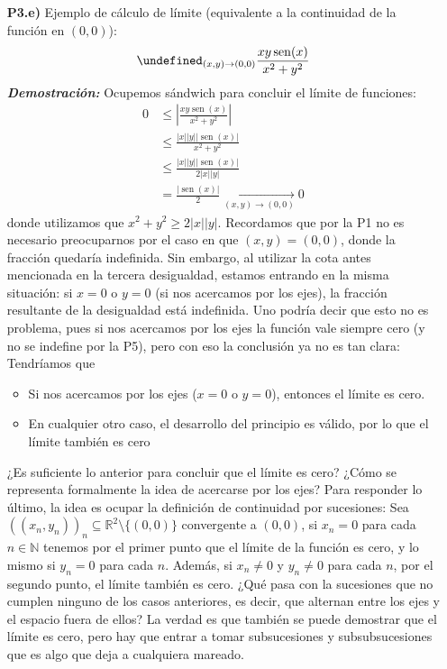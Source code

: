 \documentclass[letterpaper,11pt]{article}
\DeclareMathOperator{\sen}{sen}
\let\lim=\undefined\DeclareMathOperator*{\lim}{\text{lím}}
\newcommand{\conv}[2]{\xrightarrow[#1\to#2]{}}
\newcommand{\N}{\mathbb{N}}
\newcommand{\R}{\mathbb{R}}
\newcommand{\dem}{\textbf{\emph{Demostraci\'on: }}}
\newcommand{\vabs}[1]{\lvert #1\rvert}
\begin{document}

\begin{enumerate}\setlength{\itemsep}{0.4cm}	
\item[]
\end{enumerate}
\begin{enumerate}

\item[\textbf{P3.e)}] Ejemplo de cálculo de límite (equivalente a la continuidad de la función en $(0,0)$):
\[\lim_{(x,y)\to(0,0)} \frac{xy\sen(x)}{x^2+y^2}\]
\dem Ocupemos sándwich para concluir el límite de funciones:
\begin{align*}
    0&\leq\left\lvert\frac{xy\sen(x)}{x^2+y^2}\right\rvert\\
    &\leq\frac{\vabs{x}\vabs{y}\vabs{\sen(x)}}{x^2+y^2}\\
    &\leq\frac{\vabs{x}\vabs{y}\vabs{\sen(x)}}{2\vabs{x}\vabs{y}}\\
    &=\frac{\vabs{\sen(x)}}{2}\conv{(x,y)}{(0,0)}0
\end{align*}
donde utilizamos que $x^2+y^2\geq2\vabs{x}\vabs{y}$. Recordamos que por la P1 no es necesario preocuparnos por el caso en que $(x,y)=(0,0)$, donde la fracción quedaría indefinida. Sin embargo, al utilizar la cota antes mencionada en la tercera desigualdad, estamos entrando en la misma situación: si $x=0$ o $y=0$ (si nos acercamos por los ejes), la fracción resultante de la desigualdad está indefinida. Uno podría decir que esto no es problema, pues si nos acercamos por los ejes la función vale siempre cero (y no se indefine por la P5), pero con eso la conclusión ya no es tan clara: Tendríamos que
\begin{itemize}
    \item Si nos acercamos por los ejes ($x=0$ o $y=0$), entonces el límite es cero.
    \item En cualquier otro caso, el desarrollo del principio es válido, por lo que el límite también es cero
\end{itemize}
¿Es suficiente lo anterior para concluir que el límite es cero? ¿Cómo se representa formalmente la idea de acercarse por los ejes?
Para responder lo último, la idea es ocupar la definición de continuidad por sucesiones: Sea $((x_n,y_n))_n\subseteq\R^2\setminus\{(0,0)\}$ convergente a $(0,0)$, si $x_n=0$ para cada $n\in\N$ tenemos por el primer punto que el límite de la función es cero, y lo mismo si $y_n=0$ para cada $n$. Además, si $x_n\neq0$ y $y_n\neq0$ para cada $n$, por el segundo punto, el límite también es cero. ¿Qué pasa con la sucesiones que no cumplen ninguno de los casos anteriores, es decir, que alternan entre los ejes y el espacio fuera de ellos? La verdad es que también se puede demostrar que el límite es cero, pero hay que entrar a tomar subsucesiones y subsubsucesiones que es algo que deja a cualquiera mareado.\\


\end{enumerate}
\end{document}
